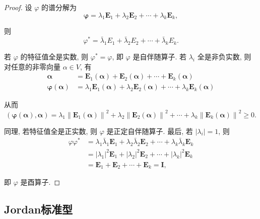 \begin{proof}
    设 $\varphi$ 的谱分解为
    $$
        \boldsymbol{\varphi}=\lambda_1 \boldsymbol{E}_1+\lambda_2 \boldsymbol{E}_2+\cdots+\lambda_k \boldsymbol{E}_k,
    $$

    则
    $$
        \varphi^*=\bar{\lambda}_1 E_1+\bar{\lambda}_2 E_2+\cdots+\bar{\lambda}_k E_k .
    $$

    若 $\varphi$ 的特征值全是实数, 则 $\varphi^*=\varphi$, 即 $\varphi$ 是自伴随算子. 若 $\lambda_i$ 全是非负实数, 则对任意的非零向量 $\alpha \in V$, 有
    $$
        \begin{aligned}
            \boldsymbol{\alpha}                       & =\boldsymbol{E}_1(\boldsymbol{\alpha})+\boldsymbol{E}_2(\boldsymbol{\alpha})+\cdots+\boldsymbol{E}_k(\boldsymbol{\alpha})                               \\
            \boldsymbol{\varphi}(\boldsymbol{\alpha}) & =\lambda_1 \boldsymbol{E}_1(\boldsymbol{\alpha})+\lambda_2 \boldsymbol{E}_2(\boldsymbol{\alpha})+\cdots+\lambda_k \boldsymbol{E}_k(\boldsymbol{\alpha})
        \end{aligned}
    $$

    从而
    $$
        (\boldsymbol{\varphi}(\boldsymbol{\alpha}), \boldsymbol{\alpha})=\lambda_1\left\|\boldsymbol{E}_1(\boldsymbol{\alpha})\right\|^2+\lambda_2\left\|\boldsymbol{E}_2(\boldsymbol{\alpha})\right\|^2+\cdots+\lambda_k\left\|\boldsymbol{E}_k(\boldsymbol{\alpha})\right\|^2 \geq 0 .
    $$

    同理, 若特征值全是正实数, 则 $\varphi$ 是正定自伴随算子. 最后, 若 $\left|\lambda_i\right|=1$, 则
    $$
        \begin{aligned}
            \varphi \varphi^* & =\lambda_1 \bar{\lambda}_1 \boldsymbol{E}_1+\lambda_2 \bar{\lambda}_2 \boldsymbol{E}_2+\cdots+\lambda_k \bar{\lambda}_k \boldsymbol{E}_k \\
                              & =\left|\lambda_1\right|^2 \boldsymbol{E}_1+\left|\lambda_2\right|^2 \boldsymbol{E}_2+\cdots+\left|\lambda_k\right|^2 \boldsymbol{E}_k    \\
                              & =\boldsymbol{E}_1+\boldsymbol{E}_2+\cdots+\boldsymbol{E}_k=\boldsymbol{I},
        \end{aligned}
    $$

    即 $\varphi$ 是酉算子.
\end{proof}

\subsection{Jordan标准型}


